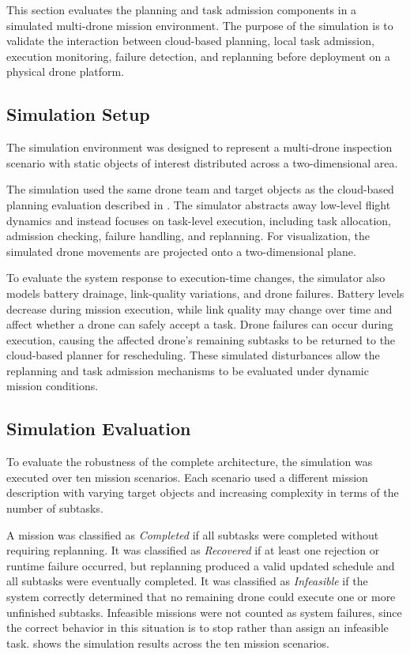 This section evaluates the planning and task admission components in a simulated
multi-drone mission environment. The purpose of the simulation is to validate the interaction
between cloud-based planning, local task admission, execution monitoring, failure detection,
and replanning before deployment on a physical drone platform.

\subsection{Simulation Setup}
The simulation environment was designed to represent a multi-drone inspection scenario with static
objects of interest distributed across a two-dimensional area.

The simulation used the same drone team and target objects as the cloud-based planning
evaluation described in .
The simulator abstracts away low-level flight dynamics and instead focuses on task-level execution, 
including task allocation, admission checking, failure handling, and replanning. For visualization, 
the simulated drone movements are projected onto a two-dimensional plane.

To evaluate the system response to execution-time changes, the simulator also models battery drainage,
link-quality variations, and drone failures. Battery levels decrease during mission execution, while
link quality may change over time and affect whether a drone can safely accept a task. Drone failures
can occur during execution, causing the affected drone's remaining subtasks to be returned to the
cloud-based planner for rescheduling. These simulated disturbances allow the replanning and task
admission mechanisms to be evaluated under dynamic mission conditions.

\subsection{Simulation Evaluation}
To evaluate the robustness of the complete architecture, the simulation was executed over ten mission
scenarios. Each scenario used a different mission description with varying target objects and increasing
complexity in terms of the number of subtasks.

A mission was classified as \textit{Completed} if all subtasks were completed without requiring replanning.
It was classified as \textit{Recovered} if at least one rejection or runtime failure occurred, but replanning
produced a valid updated schedule and all subtasks were eventually completed. It was classified as
\textit{Infeasible} if the system correctly determined that no remaining drone could execute one or more
unfinished subtasks. Infeasible missions were not counted as system failures, since the correct behavior
in this situation is to stop rather than assign an infeasible task. 
shows the simulation results across the ten mission scenarios.

